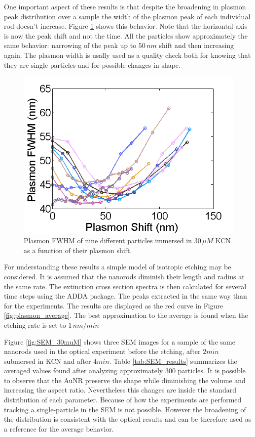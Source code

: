 \documentclass[twocolumn]{article}
\begin{document}
One important aspect of these results is that despite the broadening in plasmon
peak distribution over a sample the width of the plasmon peak of each individual
rod doesn't increase. Figure \ref{fig:FWHM} shows this behavior. Note that the
horizontal axis is now the peak shift and not the time. All the particles show
approximately the same behavior: narrowing of the peak up to $50\,nm$ shift and
then increasing again. The plasmon width is usally used as a quality check both
for knowing that they are single particles and for possible changes in shape.

\begin{figure}[hbt]
 \centering
 \includegraphics[width=0.95\linewidth]{fwhm_several.png}
 \caption{Plasmon FWHM of nine different particles immersed in $30\,\mu M$ KCN
 as a function of their plasmon shift.}
 \label{fig:FWHM}
\end{figure}

For understanding these results a simple model of isotropic etching may be
considered. It is assumed that the nanorods diminish their length and radius at
the same rate. The extinction cross section spectra is then calculated for
several time steps using the ADDA package. The peaks extracted in the same
way than for the experiments. The results are displayed as the red curve in Figure
\ref{fig:plasmon_average}. The best approximation to the average is found when
the etching rate is set to $1\,nm/min$


Figure \ref{fig:SEM_30muM} shows three SEM images for a sample of the same
nanorods used in the optical experiment before the etching, after $2min$
submersed in KCN and after $4min$. Table \ref{tab:SEM_results} summarizes the
averaged values found after analyzing approximately $300$ particles. It is
possible to observe that the AuNR preserve the shape while diminishing the
volume and increasing the aspect ratio. Nevertheless this changes are
inside the standard distribution of each parameter. Because of how the
experiments are performed tracking a single-particle in the SEM is not
possible. However the broadening of the distribution is consistent with the
optical results and can be therefore used as a reference for the average
behavior.
\end{document}
